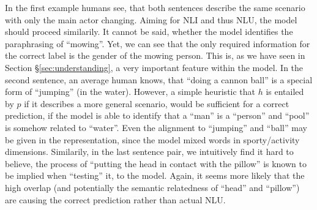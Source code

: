 In the first example humans see, that both sentences describe the same scenario with only the main actor changing. Aiming for \ac{NLI} and thus \ac{NLU}, the model should proceed similarily. It cannot be said, whether the model identifies the paraphrasing of ``mowing''. Yet, we can see that the only required information for the correct label is the gender of the mowing person. This is, as we have seen in Section §\ref{sec:understanding}, a very important feature within the model. In the second sentence, an average human knows, that ``doing a cannon ball'' is a special form of ``jumping'' (in the water). However, a simple heuristic that $h$ is entailed by $p$ if it describes a more general scenario, would be sufficient for a correct prediction, if the model is able to identify that a ``man'' is a ``person'' and ``pool'' is somehow related to ``water''. Even the alignment to ``jumping'' and ``ball'' may be given in the representation, since the model mixed words in sporty/activity dimensions. Similarily, in the last sentence pair, we intuitively find it hard to believe, the process of ``putting the head in contact with the pillow'' is known to be implied when ``testing'' it, to the model. Again, it seems more likely that the high overlap (and potentially the semantic relatedness of ``head'' and ``pillow'') are causing the correct prediction rather than actual \ac{NLU}. 

